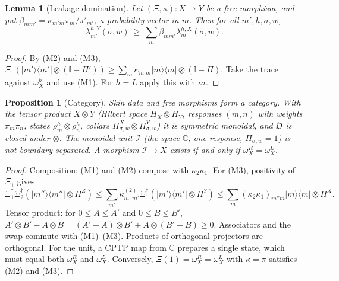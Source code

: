 \documentclass[11pt]{article}
\newtheorem{proposition}[theorem]{Proposition}
\newtheorem{lemma}[theorem]{Lemma}
\theoremstyle{definition}
\theoremstyle{remark}
\newcommand{\one}{\mathbb{I}}
\newcommand{\proj}[1]{|#1\rangle\!\langle #1|}
\newcommand{\Obj}{\mathfrak{O}}
\newcommand{\isig}{\iota\sigma}
\begin{document}
\begin{lemma}[Leakage domination]\label{lem:dom}
Let $(\Xi,\kappa):X\to Y$ be a free morphism, and put $\beta_{mm'}=\kappa_{m'm}\pi_m/\pi'_{m'}$, a probability vector in $m$. Then for all $m',h,\sigma,w$,
\[
\lambda^{h,Y}_{m'}(\sigma,w)\ \ge\ \sum_m\beta_{mm'}\lambda^{h,X}_m(\sigma,w).
\]
\end{lemma}
\begin{proof}
By (M2) and (M3), $\Xi^\dagger(\proj{m'}\otimes(\one-\Pi'))\ge\sum_m\kappa_{m'm}\proj m\otimes(\one-\Pi)$. Take the trace against $\omega^h_X$ and use (M1). For $h=L$ apply this with $\isig$.
\end{proof}

\begin{proposition}[Category]\label{prop:cat}
Skin data and free morphisms form a category. With the tensor product $X\otimes Y$ (Hilbert space $H_X\otimes H_Y$, responses $(m,n)$ with weights $\pi_m\pi_n$, states $\rho^h_m\otimes\rho^h_n$, collars $\Pi^X_{\sigma,w}\otimes\Pi^Y_{\sigma,w}$) it is symmetric monoidal, and $\Obj$ is closed under $\otimes$. The monoidal unit $\mathcal I$ (the space $\mathbb C$, one response, $\Pi_{\sigma,w}=1$) is not boundary-separated. A morphism $\mathcal I\to X$ exists if and only if $\omega^R_X=\omega^L_X$.
\end{proposition}
\begin{proof}
Composition: (M1) and (M2) compose with $\kappa_2\kappa_1$. For (M3), positivity of $\Xi_1^\dagger$ gives
\[
\Xi_1^\dagger\Xi_2^\dagger(\proj{m''}\otimes\Pi^Z)\le\textstyle\sum_{m'}\kappa^{(2)}_{m''m'}\Xi_1^\dagger(\proj{m'}\otimes\Pi^Y)\le\sum_m(\kappa_2\kappa_1)_{m''m}\proj m\otimes\Pi^X .
\] Tensor product: for $0\le A\le A'$ and $0\le B\le B'$, $A'\otimes B'-A\otimes B=(A'-A)\otimes B'+A\otimes(B'-B)\ge0$. Associators and the swap commute with (M1)--(M3). Products of orthogonal projectors are orthogonal. For the unit, a CPTP map from $\mathbb C$ prepares a single state, which must equal both $\omega^R_X$ and $\omega^L_X$. Conversely, $\Xi(1)=\omega^R_X=\omega^L_X$ with $\kappa=\pi$ satisfies (M2) and (M3).
\end{proof}
\end{document}

